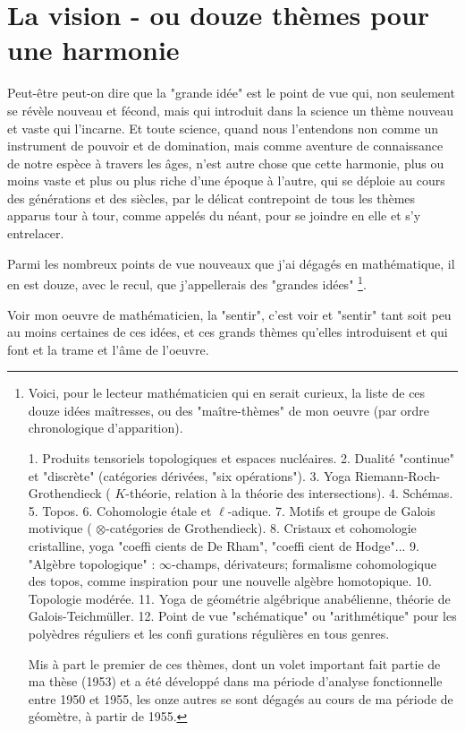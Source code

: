 \section{La vision - ou douze thèmes pour une harmonie}

Peut-être peut-on dire que la "grande idée" est le point de vue qui, non seulement se révèle nouveau et fécond, mais qui introduit dans la science un thème nouveau et vaste qui l'incarne. Et toute science, quand nous l'entendons non comme un instrument de pouvoir et de domination, mais comme aventure de connaissance de notre espèce à travers les âges, n'est autre chose que cette harmonie, plus ou moins vaste et plus ou plus riche d'une époque à l'autre, qui se déploie au cours des générations et des siècles, par le délicat contrepoint de tous les thèmes apparus tour à tour, comme appelés du néant, pour se joindre en elle et s'y entrelacer.

Parmi les nombreux points de vue nouveaux que j'ai dégagés en mathématique, il en est douze, avec le recul, que j'appellerais des "grandes idées" \footnote{Voici, pour le lecteur mathématicien qui en serait curieux, la liste de ces douze idées maîtresses, ou des "maître-thèmes" de mon oeuvre (par ordre chronologique d'apparition).

1. Produits tensoriels topologiques et espaces nucléaires.
2. Dualité "continue" et "discrète" (catégories dérivées, "six opérations").
3. Yoga Riemann-Roch-Grothendieck ( $K$-théorie, relation à la théorie des intersections).
4. Schémas.
5. Topos.
6. Cohomologie étale et $\ell$-adique.
7. Motifs et groupe de Galois motivique ( $\otimes$-catégories de Grothendieck).
8. Cristaux et cohomologie cristalline, yoga "coeffi cients de De Rham", "coeffi cient de Hodge"...
9. "Algèbre topologique" : $\infty$-champs, dérivateurs; formalisme cohomologique des topos, comme inspiration pour une nouvelle algèbre homotopique.
10. Topologie modérée.
11. Yoga de géométrie algébrique anabélienne, théorie de Galois-Teichmüller.
12. Point de vue "schématique" ou "arithmétique" pour les polyèdres réguliers et les confi gurations régulières en tous genres.

Mis à part le premier de ces thèmes, dont un volet important fait partie de ma thèse (1953) et a été développé dans ma période d'analyse fonctionnelle entre 1950 et 1955, les onze autres se sont dégagés au cours de ma période de géomètre, à partir de 1955.}.

Voir mon oeuvre de mathématicien, la "sentir", c'est voir et "sentir" tant soit peu au moins certaines de ces idées, et ces grands thèmes qu'elles introduisent et qui font et la trame et l'âme de l'oeuvre.

